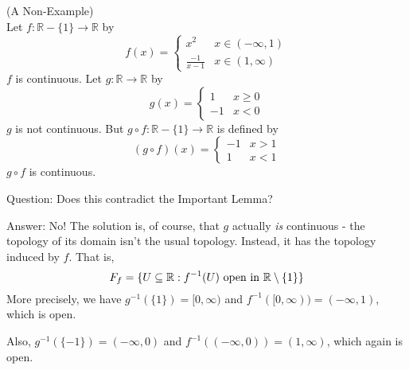 \begin{example}
(A Non-Example)\\
Let $f: \mathbb{R}-\{1\} \rightarrow \mathbb{R}$ by
\[ f(x) = 
\begin{cases}
x^2 & x\in(-\infty, 1) \\
\frac{-1}{x-1} & x\in (1, \infty) 
\end{cases}
\]
$f$ is continuous. Let $g: \mathbb{R} \rightarrow \mathbb{R}$ by
\[ g(x) = 
\begin{cases}
1 & x\ge 0 \\
-1 & x < 0 
\end{cases}
\]
$g$ is not continuous. But $g \circ f: \mathbb{R}-\{1\} \rightarrow \mathbb{R}$ is defined by
\[ (g\circ f)(x) = 
\begin{cases}
-1 & x > 1 \\
1 & x < 1 
\end{cases}
\]
$g \circ f$ is continuous. 
\end{example}
Question: Does this contradict the Important Lemma?

Answer: No! The solution is, of course, that $g$ actually \emph{is} continuous - the topology of its domain isn't the usual topology. Instead, it has the topology induced by $f$. That is,
\[F_f = \{ U\subseteq \mathbb R : f^{-1}(U)\text{ open in }\mathbb R\setminus\{1\} \}\]
More precisely, we have $g^{-1}(\{ 1\}) = [0, \infty)$ and $f^{-1}([0, \infty)) = (-\infty,1)$, which is open.

Also, $g^{-1}( \{-1 \} ) = (-\infty,0)$ and $f^{-1}((-\infty, 0)) = (1, \infty)$, which again is open.

